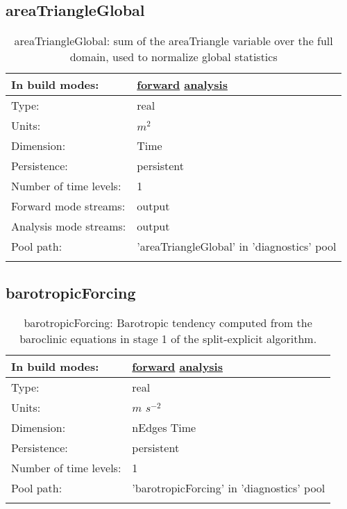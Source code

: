 \subsection[areaTriangleGlobal]{areaTriangleGlobal}
\label{subsec:var_sec_diagnostics_areaTriangleGlobal}
\begin{center}
\begin{longtable}{| p{2.0in} | p{4.0in} |}
        \hline 
        In build modes: & \hyperref[subsec:forward_var_tab_diagnostics]{forward} \hyperref[subsec:analysis_var_tab_diagnostics]{analysis} \\
        \hline 
        Type: & real \\
        \hline 
        Units: & $m^2$ \\
        \hline 
        Dimension: & Time \\
        \hline 
        Persistence: & persistent \\
        \hline 
        Number of time levels: & 1 \\
        \hline 
		 Forward mode streams: &  output \\
        \hline 
		 Analysis mode streams: &  output \\
        \hline 
            Pool path: & 'areaTriangleGlobal' in 'diagnostics' pool
 \\
		 \hline 
    \caption{areaTriangleGlobal: sum of the areaTriangle variable over the full domain, used to normalize global statistics}
\end{longtable}
\end{center}
\subsection[barotropicForcing]{barotropicForcing}
\label{subsec:var_sec_diagnostics_barotropicForcing}
\begin{center}
\begin{longtable}{| p{2.0in} | p{4.0in} |}
        \hline 
        In build modes: & \hyperref[subsec:forward_var_tab_diagnostics]{forward} \hyperref[subsec:analysis_var_tab_diagnostics]{analysis} \\
        \hline 
        Type: & real \\
        \hline 
        Units: & $m$ $s^{-2}$ \\
        \hline 
        Dimension: & nEdges Time \\
        \hline 
        Persistence: & persistent \\
        \hline 
        Number of time levels: & 1 \\
        \hline 
            Pool path: & 'barotropicForcing' in 'diagnostics' pool
 \\
		 \hline 
    \caption{barotropicForcing: Barotropic tendency computed from the baroclinic equations in stage 1 of the split-explicit algorithm.}
\end{longtable}
\end{center}

